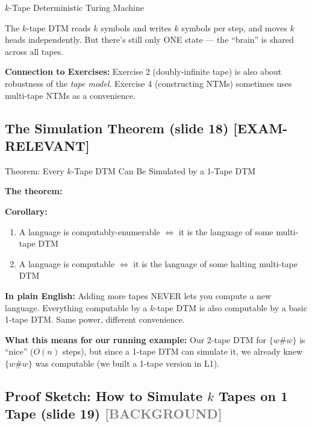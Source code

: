 \documentclass[11pt,a4paper]{article}
\newcommand{\kemark}{\textcolor{red!70!black}{\textbf{[EXAM-RELEVANT]}}}
\newcommand{\kbg}{\textcolor{gray}{\textbf{[BACKGROUND]}}}
\newcommand{\kt}[1]{\par\vspace{0.3em}\colorbox{yellow!60}{\parbox{\dimexpr\linewidth-2\fboxsep}{#1}}\vspace{0.3em}}
\begin{document}
\begin{definitionbox}{$k$-Tape Deterministic Turing Machine}
\kt{The $k$-tape DTM reads $k$ symbols and writes $k$ symbols per step, and moves $k$ heads independently. But there's still only ONE state --- the ``brain'' is shared across all tapes.}

\textbf{Connection to Exercises:} Exercise 2 (doubly-infinite tape) is also about robustness of the \textit{tape model}. Exercise 4 (constructing NTMs) sometimes uses multi-tape NTMs as a convenience.
\end{definitionbox}

\subsection{The Simulation Theorem (slide 18) \kemark}

\begin{conceptbox}{{Theorem: Every $k$-Tape DTM Can Be Simulated by a 1-Tape DTM}}

\textbf{The theorem:}
\begin{center}
\end{center}

\textbf{Corollary:}
\begin{enumerate}[nosep]
\item A language is computably-enumerable $\Leftrightarrow$ it is the language of some multi-tape DTM
\item A language is computable $\Leftrightarrow$ it is the language of some halting multi-tape DTM
\end{enumerate}

\textbf{In plain English:} Adding more tapes NEVER lets you compute a new language. Everything computable by a $k$-tape DTM is also computable by a basic 1-tape DTM. Same power, different convenience.

\textbf{What this means for our running example:} Our 2-tape DTM for $\{w\#w\}$ is ``nice'' ($O(n)$ steps), but since a 1-tape DTM can simulate it, we already knew $\{w\#w\}$ was computable (we built a 1-tape version in L1).
\end{conceptbox}

\subsection{Proof Sketch: How to Simulate $k$ Tapes on 1 Tape (slide 19) \kbg}
\end{document}
